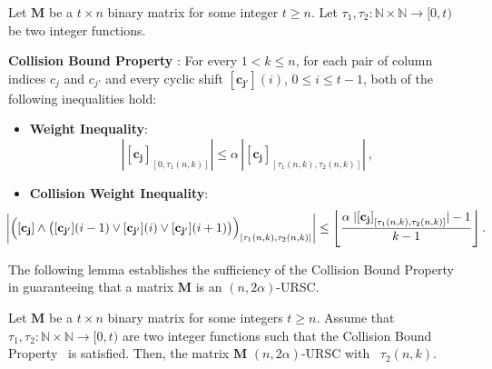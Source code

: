 \documentclass[11pt]{article}
\begin{document}
\begin{definition}\label{CBproperty}
Let $\mathbf{M}$ be a $t \times n$ 
binary matrix for some integer $t \ge n$. Let $\tau_1, \tau_2: \mathbb{N} \times \mathbb{N} \to [0,t)$ 
be two integer functions. 

\medskip
\textbf{Collision Bound Property} \pairCondition: For every $1 < k \leq n$, for each pair of column indices $c_j$ and $c_{j'}$ and every cyclic shift $\mathbf{[c_{j'}]}(i)$, $0 \leq i \leq t-1$, both of the following inequalities hold:

\begin{itemize}\item \textbf{Weight Inequality}:
    \begin{equation}\label{conjineq}
        |\mathbf{[c_j]}_{[0, \tau_1(n, k) ]} |
        \le \alpha\,|\mathbf{[c_j]}_{[\tau_1(n, k), \tau_2(n, k)]}| \ ,
    \end{equation}
    \item \textbf{Collision Weight Inequality}:
    \begin{equation}
    \label{conjineq2}
    \hspace*{-2em}
        \left|\Big(\mathbf{[c_j]} \land \big(\mathbf{[c_{j'}]}(i-1) 
                               \lor \mathbf{[c_{j'}]}(i) 
                               \lor \mathbf{[c_{j'}]}(i+1) \big)
                               \Big)_{[\tau_1(n, k), \tau_2(n, k)]}
        \right| 
        \leq \left\lfloor \frac{\alpha  \; |\mathbf{[c_j]}_{[\tau_1(n, k), \tau_2(n, k)]}|  - 1}{k - 1} \right\rfloor.
    \end{equation}     
\end{itemize}  
\end{definition}


The following lemma establishes the sufficiency of the Collision Bound Property in guaranteeing that
a matrix $\mathbf{M}$ is an $(n, 2\alpha)$-URSC.

\begin{lemma}\label{1e3}
Let $\mathbf{M}$ be a $t \times n$ binary 
matrix for some integers $t \ge n$. Assume that $\tau_1, \tau_2: \mathbb{N} \times \mathbb{N} \to [0,t)$  
are two integer functions such that the Collision Bound Property \pairCondition\ is satisfied.
Then, the matrix $\mathbf{M}$ 
{$(n, 2\alpha)$}-URSC with \elongation\ $\tau_2(n,k)$.
\end{lemma}
\end{document}
